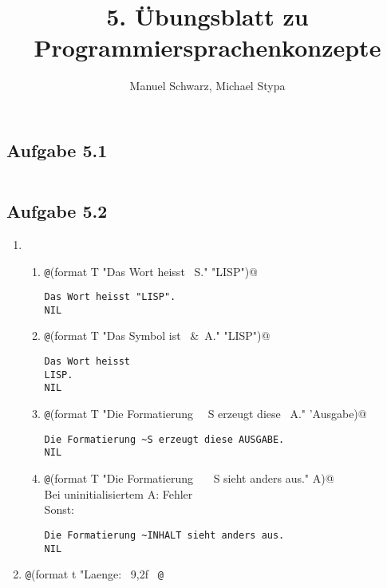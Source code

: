 \documentclass[a4paper, 12pt]{article}
\title{5. Übungsblatt zu Programmiersprachenkonzepte}
\author{Manuel Schwarz, Michael Stypa}
\begin{document}
\maketitle

\subsection*{Aufgabe 5.1}
\inputminted{common-lisp}{myreverse.lisp}

\subsection*{Aufgabe 5.2}
\begin{enumerate}
  \item
    \begin{enumerate}
      \item \texttt
            @(format T "Das Wort heisst ~S." "LISP")@
            \begin{verbatim}
Das Wort heisst "LISP".
NIL
            \end{verbatim}
      \item \texttt
            @(format T "Das Symbol ist ~&~A." "LISP")@
            \begin{verbatim}
Das Wort heisst
LISP.
NIL
            \end{verbatim}
      \item \texttt
            @(format T "Die Formatierung ~~S erzeugt diese ~A." 'Ausgabe)@
            \begin{verbatim}
Die Formatierung ~S erzeugt diese AUSGABE.
NIL
            \end{verbatim}
      \item \texttt
            @(format T "Die Formatierung ~~~S sieht anders aus." A)@ \\
            Bei uninitialisiertem A: Fehler \smallskip \\
            Sonst:
            \begin{verbatim}
Die Formatierung ~INHALT sieht anders aus.
NIL
            \end{verbatim}
    \end{enumerate}
  \item \texttt
        @(format t "Laenge: ~9,2f~%
        \texttt
        @  ~%
\end{enumerate}
\end{document}
